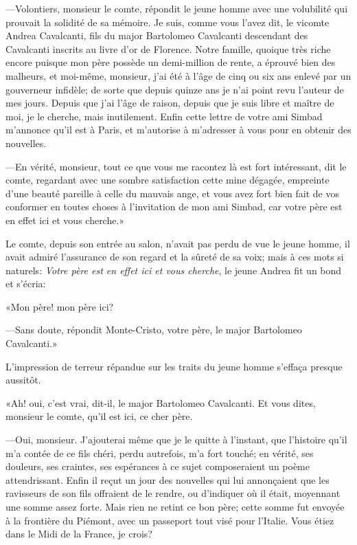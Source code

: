 —Volontiers, monsieur le comte, répondit le jeune homme avec une volubilité qui prouvait la solidité de sa mémoire. Je suis, comme vous l'avez dit, le vicomte Andrea Cavalcanti, fils du major Bartolomeo Cavalcanti descendant des Cavalcanti inscrits au livre d'or de Florence. Notre famille, quoique très riche encore puisque mon père possède un demi-million de rente, a éprouvé bien des malheurs, et moi-même, monsieur, j'ai été à l'âge de cinq ou six ans enlevé par un gouverneur infidèle; de sorte que depuis quinze ans je n'ai point revu l'auteur de mes jours. Depuis que j'ai l'âge de raison, depuis que je suis libre et maître de moi, je le cherche, mais inutilement. Enfin cette lettre de votre ami Simbad m'annonce qu'il est à Paris, et m'autorise à m'adresser à vous pour en obtenir des nouvelles. 

—En vérité, monsieur, tout ce que vous me racontez là est fort intéressant, dit le comte, regardant avec une sombre satisfaction cette mine dégagée, empreinte d'une beauté pareille à celle du mauvais ange, et vous avez fort bien fait de vos conformer en toutes choses à l'invitation de mon ami Simbad, car votre père est en effet ici et vous cherche.» 

Le comte, depuis son entrée au salon, n'avait pas perdu de vue le jeune homme, il avait admiré l'assurance de son regard et la sûreté de sa voix; mais à ces mots si naturels: \textit{Votre père est en effet ici et vous cherche}, le jeune Andrea fit un bond et s'écria: 

«Mon père! mon père ici? 

—Sans doute, répondit Monte-Cristo, votre père, le major Bartolomeo Cavalcanti.» 

L'impression de terreur répandue sur les traits du jeune homme s'effaça presque aussitôt. 

«Ah! oui, c'est vrai, dit-il, le major Bartolomeo Cavalcanti. Et vous dites, monsieur le comte, qu'il est ici, ce cher père. 

—Oui, monsieur. J'ajouterai même que je le quitte à l'instant, que l'histoire qu'il m'a contée de ce fils chéri, perdu autrefois, m'a fort touché; en vérité, ses douleurs, ses craintes, ses espérances à ce sujet composeraient un poème attendrissant. Enfin il reçut un jour des nouvelles qui lui annonçaient que les ravisseurs de son fils offraient de le rendre, ou d'indiquer où il était, moyennant une somme assez forte. Mais rien ne retint ce bon père; cette somme fut envoyée à la frontière du Piémont, avec un passeport tout visé pour l'Italie. Vous étiez dans le Midi de la France, je crois? 

